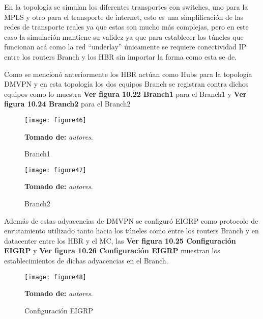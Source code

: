 En la topología se simulan los diferentes transportes con switches, uno para la MPLS y otro para el transporte de internet, esto es una simplificación de las redes de transporte reales ya que estas son mucho más complejas, pero en este caso la simulación mantiene su validez ya que para establecer los túneles que funcionan acá como la red “underlay” únicamente se requiere conectividad IP entre los routers Branch y los HBR sin importar la forma como esta se de.

Como se mencionó anteriormente los HBR actúan como Hubs para la topología DMVPN y en esta topología los dos equipos Branch se registran contra dichos equipos como lo muestra \textbf{Ver figura 10.22 Branch1} para el Branch1 y \textbf{Ver figura 10.24 Branch2} para el Branch2

\begin{figure}[htbp]
  \centering
    {\texttt{[image: figure46]}}%
  \caption{\footnotesize{Branch1}}
  \footnotesize{\textbf{Tomado de:} \textit{autores}.}
  \label{fig:fig2subfig}
\end{figure}


\begin{figure}[htbp]
  \centering
    {\texttt{[image: figure47]}}%
  \caption{\footnotesize{Branch2}}
  \footnotesize{\textbf{Tomado de:} \textit{autores}.}
  \label{fig:fig2subfig}
\end{figure}

Además de estas adyacencias de DMVPN se configuró EIGRP como protocolo de enrutamiento utilizado tanto hacia los túneles como entre los routers Branch y en datacenter entre los HBR y el MC, las \textbf{Ver figura 10.25 Configuración EIGRP} y \textbf{Ver figura 10.26 Configuración EIGRP} muestran los establecimientos de dichas adyacencias en el Branch.

\begin{figure}[htbp]
  \centering
    {\texttt{[image: figure48]}}%
  \caption{\footnotesize{Configuración EIGRP}}
  \footnotesize{\textbf{Tomado de:} \textit{autores}.}
  \label{fig:fig2subfig}
\end{figure}


